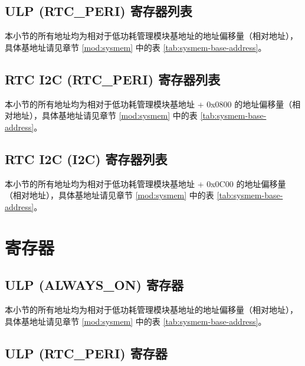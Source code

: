 \documentclass[main\_\_CN.tex]{subfiles}
\begin{document}
\subsection{ULP (RTC\_PERI) 寄存器列表}

本小节的所有地址均为相对于低功耗管理模块基地址的地址偏移量（相对地址），具体基地址请见章节 \ref{mod:sysmem} \textit{} 中的表 \ref{tab:sysmem-base-address}。


\subsection{RTC I2C (RTC\_PERI) 寄存器列表}

本小节的所有地址均为相对于低功耗管理模块基地址 + 0x{}0800 的地址偏移量（相对地址），具体基地址请见章节 \ref{mod:sysmem} \textit{} 中的表 \ref{tab:sysmem-base-address}。



\subsection{RTC I2C (I2C) 寄存器列表}\label{ulp-reg-summ}

本小节的所有地址均为相对于低功耗管理模块基地址 + 0x{}0C00 的地址偏移量（相对地址），具体基地址请见章节 \ref{mod:sysmem} \textit{} 中的表 \ref{tab:sysmem-base-address}。


\section{寄存器}



\subsection{ULP (ALWAYS\_ON) 寄存器}

本小节的所有地址均为相对于低功耗管理模块基地址的地址偏移量（相对地址），具体基地址请见章节 \ref{mod:sysmem} \textit{} 中的表 \ref{tab:sysmem-base-address}。



\subsection{ULP (RTC\_PERI) 寄存器}
\end{document}
